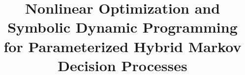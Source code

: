 \title{Nonlinear Optimization and Symbolic Dynamic Programming for Parameterized Hybrid Markov Decision Processes}


\maketitle